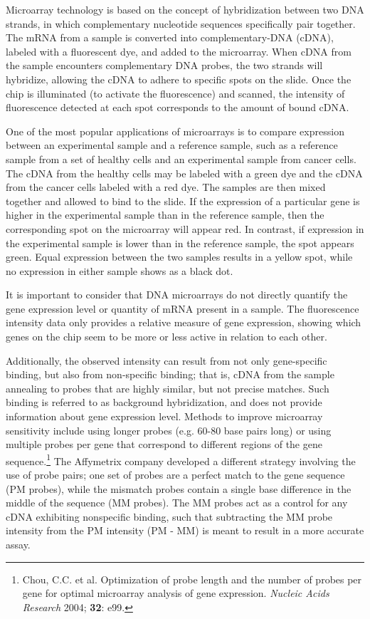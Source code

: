 Microarray technology is based on the concept of hybridization between two DNA strands, in which complementary nucleotide sequences specifically pair together. The mRNA from a sample is converted into complementary-DNA (cDNA), labeled with a fluorescent dye, and added to the microarray. When cDNA from the sample encounters complementary DNA probes, the two strands will hybridize, allowing the cDNA to adhere to specific spots on the slide. Once the chip is illuminated (to activate the fluorescence) and scanned, the intensity of fluorescence detected at each spot corresponds to the amount of bound cDNA. 

One of the most popular applications of microarrays is to compare expression between an experimental sample and a reference sample, such as a reference sample from a set of healthy cells and an experimental sample from cancer cells. The cDNA from the healthy cells may be labeled with a green dye and the cDNA from the cancer cells labeled with a red dye. The samples are then mixed together and allowed to bind to the slide. If the expression of a particular gene is higher in the experimental sample than in the reference sample, then the corresponding spot on the microarray will appear red. In contrast, if expression in the experimental sample is lower than in the reference sample, the spot appears green. Equal expression between the two samples results in a yellow spot, while no expression in either sample shows as a black dot.  

It is important to consider that DNA microarrays do not directly quantify the gene expression level or quantity of mRNA present in a sample. The fluorescence intensity data only provides a relative measure of gene expression, showing which genes on the chip seem to be more or less active in relation to each other. 

Additionally, the observed intensity can result from not only gene-specific binding, but also from non-specific binding; that is, cDNA from the sample annealing to probes that are highly similar, but not precise matches. Such binding is referred to as background hybridization, and does not provide information about gene expression level. Methods to improve microarray sensitivity include using longer probes (e.g. 60-80 base pairs long) or using multiple probes per gene that correspond to different regions of the gene sequence.\footnote{Chou, C.C. et al. Optimization of probe length and the number of probes per gene for optimal microarray analysis of gene expression. \textit{Nucleic Acids Research} 2004; \textbf{32}: e99.} The Affymetrix company developed a different strategy involving the use of probe pairs; one set of probes are a perfect match to the gene sequence (PM probes), while the mismatch probes contain a single base difference in the middle of the sequence (MM probes). The MM probes act as a control for any cDNA exhibiting nonspecific binding, such that subtracting the MM probe intensity from the PM intensity (PM - MM) is meant to result in a more accurate assay. 


